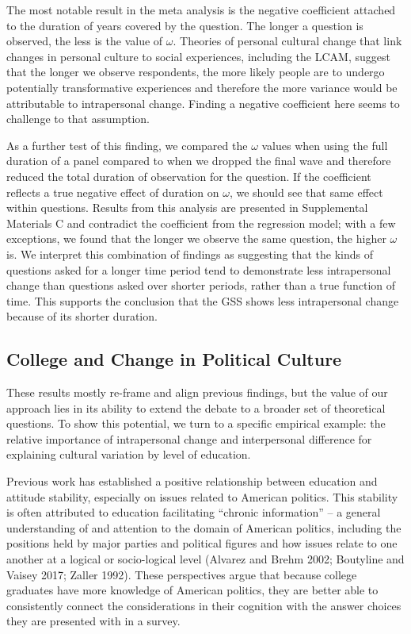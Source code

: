 \documentclass[
  12pt,
]{article}
\begin{document}
The most notable result in the meta analysis is the negative coefficient
attached to the duration of years covered by the question. The longer a
question is observed, the less is the value of \(\omega\). Theories of
personal cultural change that link changes in personal culture to social
experiences, including the LCAM, suggest that the longer we observe
respondents, the more likely people are to undergo potentially
transformative experiences and therefore the more variance would be
attributable to intrapersonal change. Finding a negative coefficient
here seems to challenge to that assumption.

As a further test of this finding, we compared the \(\omega\) values
when using the full duration of a panel compared to when we dropped the
final wave and therefore reduced the total duration of observation for
the question. If the coefficient reflects a true negative effect of
duration on \(\omega\), we should see that same effect within questions.
Results from this analysis are presented in Supplemental Materials C and
contradict the coefficient from the regression model; with a few
exceptions, we found that the longer we observe the same question, the
higher \(\omega\) is. We interpret this combination of findings as
suggesting that the kinds of questions asked for a longer time period
tend to demonstrate less intrapersonal change than questions asked over
shorter periods, rather than a true function of time. This supports the
conclusion that the GSS shows less intrapersonal change because of its
shorter duration.

\hypertarget{college-and-change-in-political-culture}{%
\subsection{College and Change in Political
Culture}\label{college-and-change-in-political-culture}}

These results mostly re-frame and align previous findings, but the value
of our approach lies in its ability to extend the debate to a broader
set of theoretical questions. To show this potential, we turn to a
specific empirical example: the relative importance of intrapersonal
change and interpersonal difference for explaining cultural variation by
level of education.

Previous work has established a positive relationship between education
and attitude stability, especially on issues related to American
politics. This stability is often attributed to education facilitating
``chronic information'' -- a general understanding of and attention to
the domain of American politics, including the positions held by major
parties and political figures and how issues relate to one another at a
logical or socio-logical level (Alvarez and Brehm 2002; Boutyline and
Vaisey 2017; Zaller 1992). These perspectives argue that because college
graduates have more knowledge of American politics, they are better able
to consistently connect the considerations in their cognition with the
answer choices they are presented with in a survey.
\end{document}
